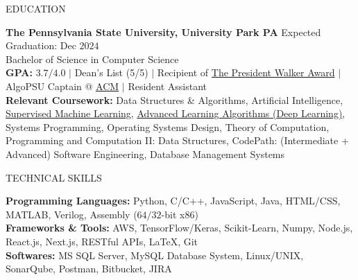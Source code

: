 \documentclass{resume} %
\begin{document}

\begin{rSection}{EDUCATION}

{\bf The Pennsylvania State University, University Park PA} \hfill {Expected Graduation: Dec $2024$}\\
{Bachelor of Science in Computer Science}\\
{\bf GPA:} $3.7/4.0$ $\vert$ Dean's List (5/5) $\vert$ Recipient of \href{https://awardsrecognition.psu.edu/student/undergraduate-scholastic-awards/}{The President Walker Award} $\vert$ AlgoPSU Captain @ \href{https://acm.psu.edu/algopsu/}{ACM} $\vert$ Resident Assistant\\
{\bf Relevant Coursework:} Data Structures \& Algorithms, Artificial Intelligence, \href{https://www.coursera.org/account/accomplishments/verify/JYX5UB5YP4YD}{Supervised Machine Learning}, \href{https://www.coursera.org/account/accomplishments/records/PBF4QN2KQL4Z}{Advanced Learning Algorithms (Deep Learning)}, Systems Programming, Operating Systems Design, Theory of Computation, Programming and Computation II: Data Structures, CodePath: (Intermediate + Advanced) Software Engineering, Database Management Systems
\end{rSection}


\begin{rSection}{TECHNICAL SKILLS}

{\bf Programming Languages:} Python, C/C++, JavaScript, Java, HTML/CSS, MATLAB, Verilog, Assembly ($64/32$-bit x$86$)\\
{\bf Frameworks \& Tools:} AWS, TensorFlow/Keras, Scikit-Learn, Numpy, Node.js, React.js, Next.js, RESTful APIs, \LaTeX, Git\\
{\bf Softwares:} MS SQL Server, MySQL Database System, Linux/UNIX, SonarQube, Postman, Bitbucket, JIRA

\end{rSection}
\end{document}
